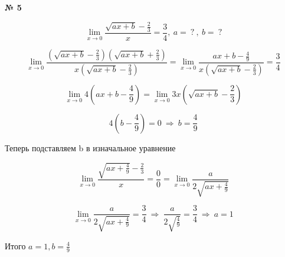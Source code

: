 \documentclass{article}
\begin{document}
\textbf{№ 5} 
\large

$$ \lim\limits_{x \to 0} \frac{\sqrt{ax + b} - \frac{2}{3}}{x}
= \frac{3}{4}, \ a = \ ? \ , \ b = \ ? $$  

$$ \lim\limits_{x \to 0} 
\frac{\left(\sqrt{ax + b} - \frac{2}{3}\right) \left(\sqrt{ax+b} + \frac{2}{3}\right)}
{x \left( \sqrt{ax+b} - \frac{2}{3}\right)} 
= \lim\limits_{x \to 0} \frac{ax + b - \frac{4}{9}}{x \left( \sqrt{ax+b} - \frac{2}{3}\right)} 
= \frac{3}{4} $$

$$ \lim\limits_{x \to 0} 4 \left( ax + b - \frac{4}{9} \right)
= \lim\limits_{x \to 0} 3x \left( \sqrt{ax+b} - \frac{2}{3}\right) $$

$$ 4 \left( b - \frac{4}{9} \right) 
= 0 
\
\Rightarrow 
\
b = \frac{4}{9} $$

Теперь подставляем b в изначальное уравнение

$$ \lim\limits_{x \to 0} \frac{\sqrt{ax + \frac{4}{9}} - \frac{2}{3}}{x}
= \frac{0}{0}
= \lim\limits_{x \to 0} \frac{a}{2\sqrt{ax+\frac{4}{9}}} $$

$$ \lim\limits_{x \to 0} \frac{a}{2\sqrt{ax+\frac{4}{9}}} 
= \frac{3}{4}
\
\Rightarrow 
\
\frac{a}{2\sqrt{\frac{4}{9}}}
= \frac{3}{4} 
\
\Rightarrow 
\
a = 1
$$

Итого $ a = 1, b = \frac{4}{9} $
\end{document}
